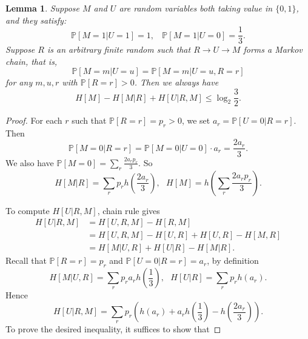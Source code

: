 \documentclass{article}
\newtheorem{lemma}[theorem]{Lemma}
\begin{document}
\begin{lemma}\label{lem_key}
Suppose $M$ and $U$ are random variables both taking value in $\{0, 1\}$, and they satisfy: 
$$\mathbb{P}[M=1|U=1]=1,~~~~\mathbb{P}[M=1|U=0]=\frac{1}{3}.$$ 
Suppose $R$ is an arbitrary finite random such that $R\to U \to M$ forms a Markov chain, that is,
$$
\mathbb{P}[M=m|U=u]=\mathbb{P}[M=m|U=u,R=r]
$$
for any $m,u,r$ with $\mathbb{P}[R=r]>0$. Then we always have $$H[M]-H[M|R]+H[U|R, M] \le \log_2 \frac{3}{2}.$$
\end{lemma}
\begin{proof}
For each $r$ such that $\mathbb{P}[R=r]=p_r>0$, we set $a_r=\mathbb{P}[U=0|R=r]$. Then 
$$\mathbb{P}[M=0|R=r]=\mathbb{P}[M=0|U=0] \cdot a_r = \frac{2a_r}{3}.$$
We also have $\mathbb{P}[M=0]=\sum_r \frac{2a_r p_r}{3}$. So 
$$H[M|R]=\sum_r p_r h\left(\frac{2a_r}{3}\right),~~~H[M]=h\left(\sum_r\frac{2a_rp_r}{3}\right).$$ 

To compute $H[U|R, M]$, chain rule gives
\begin{align*}
    H[U|R,M]&=H[U,R,M]-H[R,M]\\
            &=H[U,R,M]-H[U,R]+H[U,R]-H[M,R]\\
            &=H[M|U,R]+H[U|R]-H[M|R].
\end{align*}
Recall that $\mathbb{P}[R=r]=p_r$ and $\mathbb{P}[U=0|R=r]=a_r$, by definition
$$
    H[M|U,R]=\sum_r p_r a_r h\left(\frac{1}{3}\right),~~~H[U|R]=\sum_r p_r h(a_r).
$$
Hence $$H[U|R,M]=\sum_r p_r \left(h(a_r)+a_rh\left(\frac{1}{3}\right)-h\left(\frac{2a_r}{3}\right)\right).$$
To prove the desired inequality, it suffices to show that

\end{proof}
\end{document}

